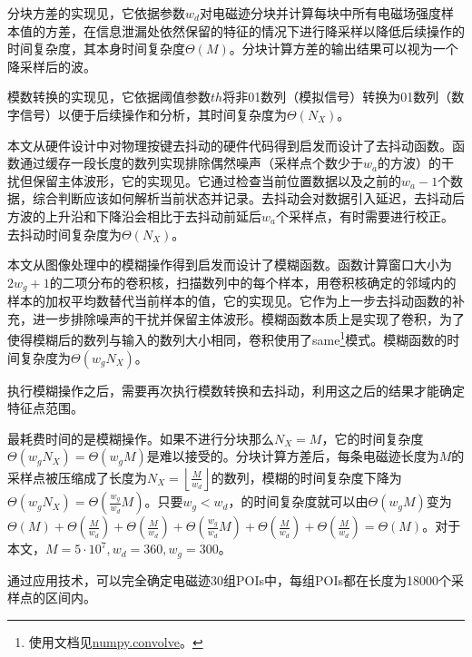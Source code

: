 {{	分块方差的实现见，它依据参数$w_d$对电磁迹分块并计算每块中所有电磁场强度样本值的方差，在信息泄漏处依然保留的特征的情况下进行降采样以降低后续操作的时间复杂度，其本身时间复杂度$\Theta(M)$。分块计算方差的输出结果可以视为一个降采样后的波。
	
	模数转换的实现见，它依据阈值参数$th$将非01数列（模拟信号）转换为01数列（数字信号）以便于后续操作和分析，其时间复杂度为$\Theta(N_X)$。
	
	本文从硬件设计中对物理按键去抖动的硬件代码得到启发而设计了去抖动函数。函数通过缓存一段长度的数列实现排除偶然噪声（采样点个数少于$w_a$的方波）的干扰但保留主体波形，它的实现见。它通过检查当前位置数据以及之前的$w_a-1$个数据，综合判断应该如何解析当前状态并记录。去抖动会对数据引入延迟，去抖动后方波的上升沿和下降沿会相比于去抖动前延后$w_a$个采样点，有时需要进行校正。去抖动时间复杂度为$\Theta(N_X)$。
	
	本文从图像处理中的模糊操作得到启发而设计了模糊函数。函数计算窗口大小为$2w_g+1$的二项分布的卷积核，扫描数列中的每个样本，用卷积核确定的邻域内的样本的加权平均数替代当前样本的值，它的实现见。它作为上一步去抖动函数的补充，进一步排除噪声的干扰并保留主体波形。模糊函数本质上是实现了卷积，为了使得模糊后的数列与输入的数列大小相同，卷积使用了same\footnote{使用文档见\href{https://numpy.org/doc/stable/reference/generated/numpy.convolve.html}{numpy.convolve}。}模式。模糊函数的时间复杂度为$\Theta(w_gN_X)$。
	
	执行模糊操作之后，需要再次执行模数转换和去抖动，利用这之后的结果才能确定特征点范围。

	\poifanwei 最耗费时间的是模糊操作。如果不进行分块那么$N_X=M$，它的时间复杂度$\Theta(w_gN_X)=\Theta(w_gM)$是难以接受的。分块计算方差后，每条电磁迹长度为$M$的采样点被压缩成了长度为$N_X=\left\lfloor\frac{M}{w_d}\right\rfloor$的数列，模糊的时间复杂度下降为$\Theta(w_gN_X)=\Theta(\frac{w_g}{w_d}M)$。只要$w_g<w_d$，\poifanwei 的时间复杂度就可以由$\Theta\left( w_gM\right) $变为$\Theta(M)+\Theta\left( \frac{M}{w_d}\right) +\Theta\left( \frac{M}{w_d}\right) +\Theta\left( \frac{w_g}{w_d}M\right) +\Theta\left( \frac{M}{w_d}\right) +\Theta\left( \frac{M}{w_d}\right) =\Theta(M)$。对于本文，$M=5\cdot10^7,w_d=360,w_g=300$。
	
	通过应用\poifanwei 技术，可以完全确定电磁迹30组POIs中，每组POIs都在长度为18000个采样点的区间内。%
	
}}
